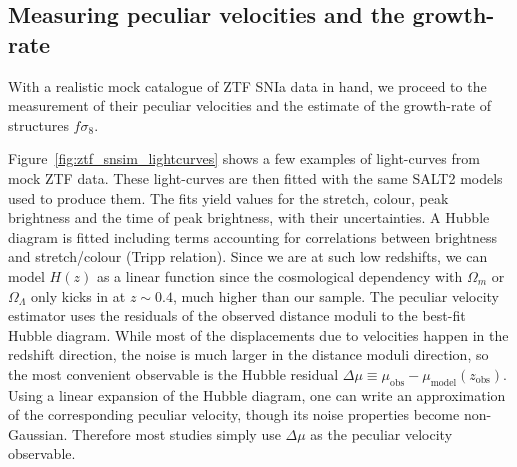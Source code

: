 \subsection{Measuring peculiar velocities and the growth-rate}
\label{velocities:ztf_fs8:measurements}

With a realistic mock catalogue of ZTF SNIa data in hand, we proceed to the measurement of 
their peculiar velocities and the estimate of the growth-rate of structures $f\sigma_8$. 

Figure~\ref{fig:ztf_snsim_lightcurves} shows a few examples of light-curves from mock ZTF data.
These light-curves are then fitted with the same SALT2 models used to produce them. 
The fits yield values for the stretch, colour, peak brightness and the time of peak brightness, 
with their uncertainties. 
A Hubble diagram is fitted including terms accounting for correlations between brightness and 
stretch/colour (Tripp relation). 
Since we are at such low redshifts, we can model $H(z)$ as a linear function since 
the cosmological dependency with $\Omega_m$ or $\Omega_\Lambda$ only kicks in at $z \sim 0.4$, 
much higher than our sample. 
The peculiar velocity estimator uses the residuals of the observed distance moduli to the
best-fit Hubble diagram. While most of the displacements due to velocities happen in the redshift direction,
the noise is much larger in the distance moduli direction, so the most convenient observable is 
the Hubble residual $\Delta \mu \equiv \mu_\text{obs} - \mu_\text{model}(z_\text{obs})$. 
Using a linear expansion of the Hubble diagram, one can write an approximation of the corresponding 
peculiar velocity, though its noise properties become non-Gaussian. Therefore most studies 
simply use $\Delta \mu$ as the peculiar velocity observable. 


